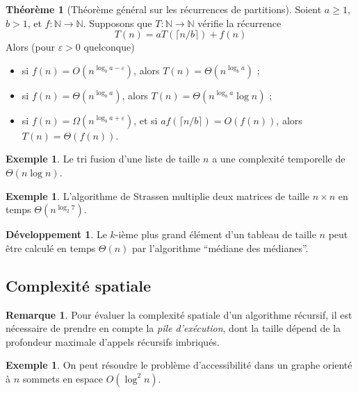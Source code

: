 \documentclass[a5paper, 10pt]{article}
\theoremstyle{definition}
\newtheorem{example}[equation]{Exemple}
\newtheorem{theorem}[equation]{Théorème}
\newtheorem{remark}[equation]{Remarque}
\newcounter{n}
\newtheorem{dev}[n]{Développement}
\def\N{\mathbb{N}}
\begin{document}
\begin{theorem}[Théorème général sur les récurrences de partitions]
  Soient $a \geq 1$, $b > 1$, et $f : \N \to \N$. Supposons que $T : \N \to \N$
  vérifie la récurrence
  \[ T(n) = a T( \lceil n / b \rceil) + f(n) \]
  Alors (pour $\varepsilon > 0$ quelconque)
  \begin{itemize}
  \item si $f(n) = O\left( n^{\log_b a - \varepsilon} \right)$,
    alors $T(n) = \Theta\left(n^{\log_b a}\right)$ ;
  \item si $f(n) = \Theta\left( n^{\log_b a} \right)$,
    alors $T(n) = \Theta\left(n^{\log_b a} \log n\right)$ ;
  \item si $f(n) = \Omega\left( n^{\log_b a + \varepsilon} \right)$, et si
    $a f( \lceil n / b \rceil) = O(f(n))$, alors $T(n) =
    \Theta\left(f(n)\right)$.
  \end{itemize}
\end{theorem}

\begin{example}
  Le tri fusion d'une liste de taille $n$ a une complexité temporelle de
  $\Theta(n \log n)$.
\end{example}
\begin{example}
  L'algorithme de Strassen multiplie deux matrices de taille $n \times n$ en
  temps $\Theta\left(n^{\log_2 7}\right)$.
\end{example}
\begin{dev}
  Le $k$-ième plus grand élément d'un tableau de taille $n$ peut être calculé en
 temps $\Theta(n)$ par l'algorithme \enquote{médiane des médianes}.
\end{dev}

\subsection{Complexité spatiale}

\begin{remark}
  Pour évaluer la complexité spatiale d'un algorithme récursif, il est
  nécessaire de prendre en compte la \emph{pile d'exécution}, dont la taille
  dépend de la profondeur maximale d'appels récursifs imbriqués.
\end{remark}

\begin{example}
  On peut résoudre le problème d'accessibilité dans un graphe orienté à $n$
  sommets en espace $O(\log^2 n)$.
\end{example}
\end{document}
